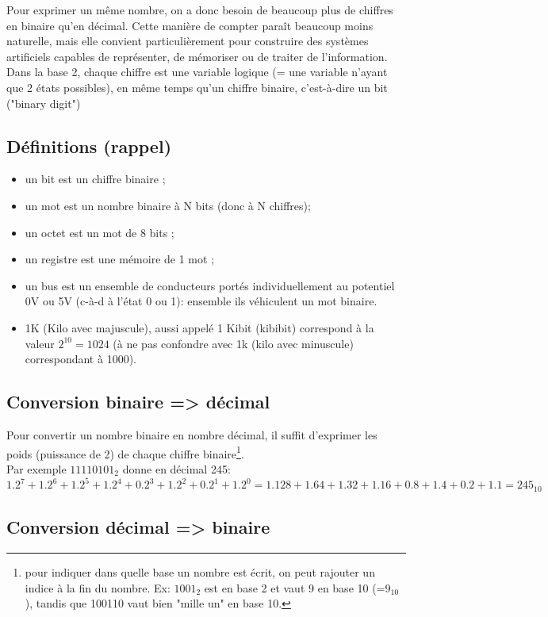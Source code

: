 Pour exprimer un même nombre, on a donc besoin de beaucoup plus de chiffres en binaire qu'en décimal.
Cette manière de compter paraît beaucoup moins naturelle, mais elle convient particulièrement pour construire des systèmes artificiels capables de représenter, de mémoriser ou de traiter de l'information.
Dans la base 2, chaque chiffre est une variable logique (= une variable n'ayant que 2 états possibles), en même temps qu'un chiffre binaire, c'est-à-dire un bit ("binary digit")

\subsection{Définitions (rappel)}
\begin{itemize}
\item un bit est un chiffre binaire ;
\item un mot est un nombre binaire à N bits (donc à N chiffres);
\item un octet est un mot de 8 bits ;
\item un registre est une mémoire de 1 mot ;
\item un bus est un ensemble de conducteurs portés individuellement au potentiel 0V ou 5V (c-à-d à l’état 0 ou 1): ensemble ils véhiculent un mot binaire.
\item 1K (Kilo avec majuscule), aussi appelé 1 Kibit (kibibit) correspond à la valeur $2^10=1024$ (à ne pas confondre avec 1k (kilo avec minuscule) correspondant à 1000).
\end{itemize}

\subsection{Conversion binaire => décimal}
Pour convertir un nombre binaire en nombre décimal, il suffit d'exprimer les poids (puissance de 2) de chaque chiffre binaire\footnote{pour indiquer dans quelle base un nombre est écrit, on peut rajouter un indice à la fin du nombre. Ex: $1001_2$ est en base 2 et vaut 9 en base 10 (=$9_{10}$), tandis que 100110 vaut bien "mille un" en base 10.}.\\
Par exemple $11110101_2$ donne en décimal 245:\\
$1.2^7 + 1.2^6 + 1.2^5 + 1.2^4 + 0.2^3 + 1.2^2 + 0.2^1 + 1.2^0 =
1.128 + 1.64 + 1.32 + 1.16 + 0.8 + 1.4 + 0.2 + 1.1 = 245_{10}$


\subsection{Conversion décimal => binaire}

